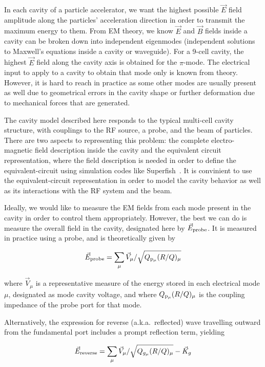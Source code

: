 \documentclass[a4paper,12pt]{article}
\begin{document}
In each cavity of a particle accelerator, we want the highest possible $\vec{E}$ field amplitude along the particles' acceleration direction in order to transmit the maximum energy to them.  From EM theory, we know $\vec{E}$ and $\vec{B}$ fields inside a cavity can be broken down into independent eigenmodes (independent solutions to Maxwell's equations inside a cavity or waveguide). For a 9-cell cavity, the highest $\vec{E}$ field along the cavity axis is obtained for the $\pi$-mode. The electrical input to apply to a cavity to obtain that mode only is known from theory. However, it is hard to reach in practice as some other modes are usually present as well due to geometrical errors in the cavity shape or further deformation due to mechanical forces that are generated.

The cavity model described here responds to the typical multi-cell cavity structure, with couplings to the RF source, a probe, and the beam of particles. There are two aspects to representing this problem: the complete electro-magnetic field description inside the cavity and the equivalent circuit representation, where the field description is needed in order to define the equivalent-circuit using simulation codes like Superfish~\cite{ref:superfish}. It is convinient to use the equivalent-circuit representation in order to model the cavity behavior as well as its interactions with the RF system and the beam.

Ideally, we would like to measure the EM fields from each mode present in the cavity in order to control them appropriately. However, the best  we can do is measure the overall field in the cavity, designated here by $\vec E_{\rm probe}$. It is measured in practice using a probe, and is theoretically given by

\begin{equation}
  \vec E_{\rm probe} = \sum_{\mu} \vec{V}_{\mu} /\sqrt{Q_{\rm p_{\mu}}(R/Q)_{\mu}}
  \label{eq:E_probe}
\end{equation}

\noindent where $\vec{V}_{\mu}$ is a representative measure of the energy stored in each electrical mode $\mu$, designated as mode cavity voltage, and where $Q_{\rm p_{\mu}}(R/Q)_{\mu}$ is the coupling impedance of the probe port for that mode.

Alternatively, the expression for reverse (a.k.a.~reflected) wave travelling outward from the fundamental port includes a prompt reflection term, yielding

\begin{equation}
  \vec E_{\rm reverse}=\sum_\mu \vec V_\mu / \sqrt{Q_{g_{\mu}}(R/Q)_\mu} - \vec K_g
  \label{eq:E_reverse}
\end{equation}
\end{document}
